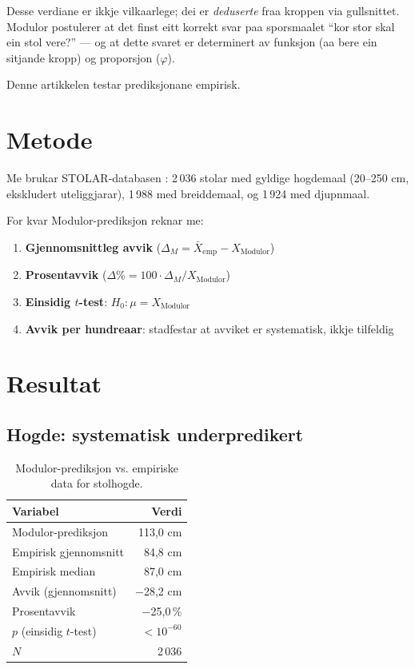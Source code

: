 \documentclass[10pt, a4paper, twocolumn]{article}
\begin{document}
Desse verdiane er ikkje vilkaarlege; dei er \emph{deduserte} fraa kroppen via gullsnittet. Modulor postulerer at det finst eitt korrekt svar paa sporsmaalet ``kor stor skal ein stol vere?'' --- og at dette svaret er determinert av funksjon (aa bere ein sitjande kropp) og proporsjon ($\varphi$).

Denne artikkelen testar prediksjonane empirisk.


\section{Metode}

Me brukar STOLAR-databasen \citep{finne2026}: 2\,036 stolar med gyldige hogdemaal (20--250 cm, ekskludert uteliggjarar), 1\,988 med breiddemaal, og 1\,924 med djupnmaal.

For kvar Modulor-prediksjon reknar me:
\begin{enumerate}
  \item \textbf{Gjennomsnittleg avvik} ($\Delta_M = \bar{X}_{\text{emp}} - X_{\text{Modulor}}$)
  \item \textbf{Prosentavvik} ($\Delta\% = 100 \cdot \Delta_M / X_{\text{Modulor}}$)
  \item \textbf{Einsidig $t$-test}: $H_0: \mu = X_{\text{Modulor}}$
  \item \textbf{Avvik per hundreaar}: stadfestar at avviket er systematisk, ikkje tilfeldig
\end{enumerate}


\section{Resultat}

\subsection{Hogde: systematisk underpredikert}

\begin{table}[!ht]
\centering
\caption{Modulor-prediksjon vs. empiriske data for stolhogde.}
\label{tab:modulor_h}
\begin{tabular}{lr}
\toprule
\textbf{Variabel} & \textbf{Verdi} \\
\midrule
Modulor-prediksjon & 113,0 cm \\
Empirisk gjennomsnitt & 84,8 cm \\
Empirisk median & 87,0 cm \\
Avvik (gjennomsnitt) & $-$28,2 cm \\
Prosentavvik & $-$25,0\,\% \\
$p$ (einsidig $t$-test) & $< 10^{-60}$ \\
$N$ & 2\,036 \\
\bottomrule
\end{tabular}
\end{table}
\end{document}
